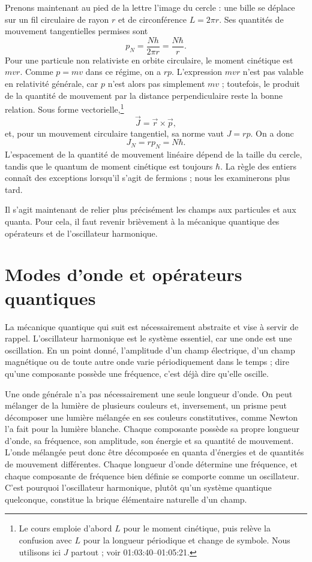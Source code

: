 Prenons maintenant au pied de la lettre l’image du cercle : une bille se déplace sur un fil circulaire de rayon \(r\) et de circonférence \(L=2\pi r\). Ses quantités de mouvement tangentielles permises sont
\begin{equation}
p_N=\frac{Nh}{2\pi r}=\frac{N\hbar}{r}.
\end{equation}
Pour une particule non relativiste en orbite circulaire, le moment cinétique est \(mvr\). Comme \(p=mv\) dans ce régime, on a \(rp\). L’expression \(mvr\) n’est pas valable en relativité générale, car \(p\) n’est alors pas simplement \(mv\) ; toutefois, le produit de la quantité de mouvement par la distance perpendiculaire reste la bonne relation. Sous forme vectorielle,\footnote{Le cours emploie d’abord \(L\) pour le moment cinétique, puis relève la confusion avec \(L\) pour la longueur périodique et change de symbole. Nous utilisons ici \(J\) partout ; voir 01:03:40--01:05:21.}
\begin{equation}
\vec J=\vec r\times\vec p,
\end{equation}
et, pour un mouvement circulaire tangentiel, sa norme vaut \(J=rp\). On a donc
\begin{equation}
J_N=rp_N=N\hbar.
\end{equation}
L’espacement de la quantité de mouvement linéaire dépend de la taille du cercle, tandis que le quantum de moment cinétique est toujours \(\hbar\). La règle des entiers connaît des exceptions lorsqu’il s’agit de fermions ; nous les examinerons plus tard.

Il s’agit maintenant de relier plus précisément les champs aux particules et aux quanta. Pour cela, il faut revenir brièvement à la mécanique quantique des opérateurs et de l’oscillateur harmonique.

\section{Modes d’onde et opérateurs quantiques}

La mécanique quantique qui suit est nécessairement abstraite et vise à servir de rappel. L’oscillateur harmonique est le système essentiel, car une onde est une oscillation. En un point donné, l’amplitude d’un champ électrique, d’un champ magnétique ou de toute autre onde varie périodiquement dans le temps ; dire qu’une composante possède une fréquence, c’est déjà dire qu’elle oscille.

Une onde générale n’a pas nécessairement une seule longueur d’onde. On peut mélanger de la lumière de plusieurs couleurs et, inversement, un prisme peut décomposer une lumière mélangée en ses couleurs constitutives, comme Newton l’a fait pour la lumière blanche. Chaque composante possède sa propre longueur d’onde, sa fréquence, son amplitude, son énergie et sa quantité de mouvement. L’onde mélangée peut donc être décomposée en quanta d’énergies et de quantités de mouvement différentes. Chaque longueur d’onde détermine une fréquence, et chaque composante de fréquence bien définie se comporte comme un oscillateur. C’est pourquoi l’oscillateur harmonique, plutôt qu’un système quantique quelconque, constitue la brique élémentaire naturelle d’un champ.

